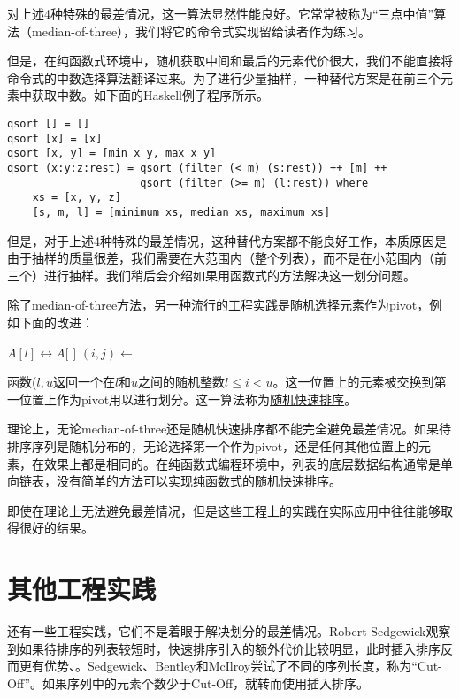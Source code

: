 \documentclass{ctexart}
\begin{document}
对上述4种特殊的最差情况，这一算法显然性能良好。它常常被称为“三点中值”算法（median-of-three），我们将它的命令式实现留给读者作为练习。

但是，在纯函数式环境中，随机获取中间和最后的元素代价很大，我们不能直接将命令式的中数选择算法翻译过来。为了进行少量抽样，一种替代方案是在前三个元素中获取中数。如下面的Haskell例子程序所示。

\lstset{language=Haskell}
\begin{lstlisting}[style=Haskell]
qsort [] = []
qsort [x] = [x]
qsort [x, y] = [min x y, max x y]
qsort (x:y:z:rest) = qsort (filter (< m) (s:rest)) ++ [m] ++
                     qsort (filter (>= m) (l:rest)) where
    xs = [x, y, z]
    [s, m, l] = [minimum xs, median xs, maximum xs]
\end{lstlisting}

但是，对于上述4种特殊的最差情况，这种替代方案都不能良好工作，本质原因是由于抽样的质量很差，我们需要在大范围内（整个列表），而不是在小范围内（前三个）进行抽样。我们稍后会介绍如果用函数式的方法解决这一划分问题。

除了median-of-three方法，另一种流行的工程实践是随机选择元素作为pivot，例如下面的改进：

\begin{algorithmic}[1]
    \State {} $A[l] \leftrightarrow A[$  $]$
    \State $(i, j) \gets $ 
    \State {}
    \State {}
  \EndIf
\EndProcedure
\end{algorithmic}

函数($l, u$返回一个在$l$和$u$之间的随机整数$l \leq i < u$。这一位置上的元素被交换到第一位置上作为pivot用以进行划分。这一算法称为\underline{随机快速排序}\cite{CLRS}。

理论上，无论median-of-three还是随机快速排序都不能完全避免最差情况。如果待排序序列是随机分布的，无论选择第一个作为pivot，还是任何其他位置上的元素，在效果上都是相同的。在纯函数式编程环境中，列表的底层数据结构通常是单向链表，没有简单的方法可以实现纯函数式的随机快速排序。

即使在理论上无法避免最差情况，但是这些工程上的实践在实际应用中往往能够取得很好的结果。

\section{其他工程实践}

还有一些工程实践，它们不是着眼于解决划分的最差情况。Robert Sedgewick观察到如果待排序的列表较短时，快速排序引入的额外代价比较明显，此时插入排序反而更有优势\cite{Bentley}、\cite{3-way-part}。Sedgewick、Bentley和McIlroy尝试了不同的序列长度，称为“Cut-Off”。如果序列中的元素个数少于Cut-Off，就转而使用插入排序。
\end{document}
